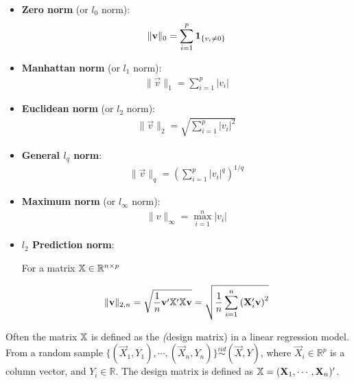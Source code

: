 \begin{itemize}
    \item \textbf{Zero norm} (or \(l_0\) norm):
    \begin{align*}
        \|\mathbf{v}\|_0 = \sum_{i=1}^p \mathbf{1}_{\{v_i \neq 0\}}
    \end{align*}

    \item \textbf{Manhattan norm} (or \(l_1\) norm):
    \begin{align*}
        \|\Vec{v}\|_1 = \sum_{i=1}^p |v_i|
    \end{align*}

    \item \textbf{Euclidean norm} (or \(l_2\) norm):
    \begin{align*}
        \|\Vec{v}\|_2 = \sqrt{\sum_{i=1}^p |v_i|^2}
    \end{align*}
    
    \item \textbf{General \(l_q\) norm}:
    \begin{align*}
        \|\Vec{v}\|_q = \left(\sum_{i=1}^p |v_i|^q\right)^{1/q}
    \end{align*}

    \item \textbf{Maximum norm} (or \(l_\infty\) norm):
    \begin{align*}
        \|v\|_\infty = \max_{i=1}^n |v_i|
    \end{align*}

    \item \textbf{ \(l_2\) Prediction norm}:
    
    For a matrix $\mathbb{X} \in \mathbb{R}^{n \times p}$

    \begin{align*}
        \|\mathbf{v}\|_{2, n} = \sqrt{
            \frac{1}{n}
            \mathbf{v}'\mathbb{X}'\mathbb{X}\mathbf{v}
        }
        =
        \sqrt{
            \frac{1}{n}
            \sum_{i=1}^n \left(\mathbf{X}_i'\mathbf{v}\right)^2
        }
    \end{align*}
\end{itemize}

Often the matrix $\mathbb{X}$ is defined as the \emph(design matrix) in a linear regression model. From a random sample $\{(\Vec{X}_1, Y_1), \cdots, (\Vec{X}_n, Y_n)\} \overset{iid}{\sim} (\Vec{X}, Y)$, where $\Vec{X}_i \in \mathbb{R}^p$ is a column vector, and $Y_i \in \mathbb{R}$. The design matrix is defined as $\mathbb{X} = (\mathbf{X}_1, \cdots, \mathbf{X}_n)'$.

